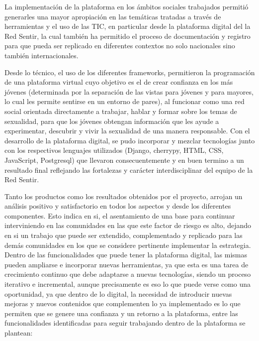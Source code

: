 \documentclass[journal,transmag]{IEEEtran}
\begin{document}
La implementación de la plataforma en los ámbitos sociales trabajados permitió generarles una mayor apropiación en las temáticas tratadas a través de herramientas y el uso de las TIC, en particular desde la plataforma digital del la Red Sentir, la cual también ha permitido el proceso de documentación y registro para que pueda ser replicado en diferentes contextos no solo nacionales sino también internacionales. 

Desde lo técnico, el uso de los diferentes frameworks, permitieron la programación de una plataforma virtual cuyo objetivo es el de crear confianza en los más jóvenes (determinada por la separación de las vistas para jóvenes y para mayores, lo cual les permite sentirse en un entorno de pares), al funcionar como una red social orientada directamente a trabajar, hablar y formar sobre los temas de sexualidad, para que los jóvenes obtengan información que les ayude a experimentar, descubrir y vivir la sexualidad de una manera responsable. Con el desarrollo de la plataforma digital, se pudo incorporar y mezclar tecnologías junto 
con los respectivos lenguajes utilizados (Django, cherrypy, HTML, CSS, JavaScript, Postgresql) que llevaron consecuentemente y en buen termino a un resultado final reflejando las fortalezas y carácter interdisciplinar del equipo de la Red Sentir.

Tanto los productos como los resultados obtenidos por el proyecto, arrojan un análisis positivo y satisfactorio en todos los aspectos y desde los diferentes componentes. Esto indica en si, el asentamiento de una base para continuar interviniendo en las comunidades en las que este factor de riesgo es alto, dejando en si un trabajo que puede ser extendido, complementado y replicado para las demás comunidades en los que se considere pertinente implementar la estrategia. Dentro de las funcionalidades que puede tener la plataforma digital, las mismas pueden ampliarse e incorporar nuevas herramientas, ya que esta es una tarea de crecimiento continuo que debe adaptarse a nuevas tecnologías, siendo un proceso iterativo e incremental, aunque precisamente es eso lo que puede verse como una oportunidad, ya que dentro de lo digital, la necesidad de introducir nuevas mejoras y nuevos contenidos que complementen lo ya implementado es lo que permiten que se genere una confianza y un retorno a la plataforma, entre las funcionalidades identificadas para seguir trabajando dentro de la plataforma se plantean:
\end{document}
